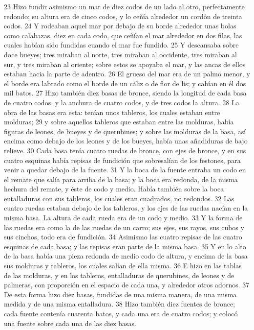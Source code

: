  
23 Hizo fundir asimismo un mar de diez codos   de un lado al otro, perfectamente redondo; su altura era de cinco codos, y lo ceñía alrededor un cordón de treinta codos.
24 Y rodeaban aquel mar por debajo de su borde alrededor unas bolas como calabazas, diez en cada codo,  que ceñían el mar alrededor en dos filas, las cuales habían sido fundidas cuando el mar fue fundido.
25 Y descansaba sobre doce bueyes; tres miraban al norte, tres miraban al occidente, tres miraban al sur, y tres miraban al oriente; sobre estos se apoyaba el mar, y las ancas de ellos estaban hacia la parte de adentro.
26 El grueso del mar era de un palmo menor,  y el borde era labrado como el borde de un cáliz o de flor de lis; y cabían en él dos mil batos.
27 Hizo también diez basas de bronce, siendo la longitud de cada basa de cuatro codos,  y la anchura de cuatro codos, y de tres codos la altura.
28 La obra de las basas era esta: tenían unos tableros, los cuales estaban entre molduras;
29 y sobre aquellos tableros que estaban entre las molduras, había figuras de leones, de bueyes y de querubines; y sobre las molduras de la basa, así encima como debajo de los leones y de los bueyes, había unas añadiduras de bajo relieve.
30 Cada basa tenía cuatro ruedas de bronce, con ejes de bronce, y en sus cuatro esquinas había repisas de fundición que sobresalían de los festones, para venir a quedar debajo de la fuente.
31 Y la boca de la fuente entraba un codo   en el remate que salía para arriba de la basa; y la boca era redonda, de la misma hechura del remate, y éste de codo y medio. Había también sobre la boca entalladuras con sus tableros, los cuales eran cuadrados, no redondos.
32 Las cuatro ruedas estaban debajo de los tableros, y los ejes de las ruedas nacían en la misma basa. La altura de cada rueda era de un codo   y medio.
33 Y la forma de las ruedas era como la de las ruedas de un carro; sus ejes, sus rayos, sus cubos y sus cinchos, todo era de fundición.
34 Asimismo las cuatro repisas de las cuatro esquinas de cada basa; y las repisas eran parte de la misma basa.
35 Y en lo alto de la basa había una pieza redonda de medio codo   de altura, y encima de la basa sus molduras y tableros, los cuales salían de ella misma.
36 E hizo en las tablas de las molduras, y en los tableros, entalladuras de querubines, de leones y de palmeras, con proporción en el espacio de cada una, y alrededor otros adornos.
37 De esta forma hizo diez basas, fundidas de una misma manera, de una misma medida y de una misma entalladura.
38 Hizo también diez fuentes de bronce; cada fuente contenía cuarenta batos,  y cada una era de cuatro codos; y colocó una fuente sobre cada una de las diez basas.
